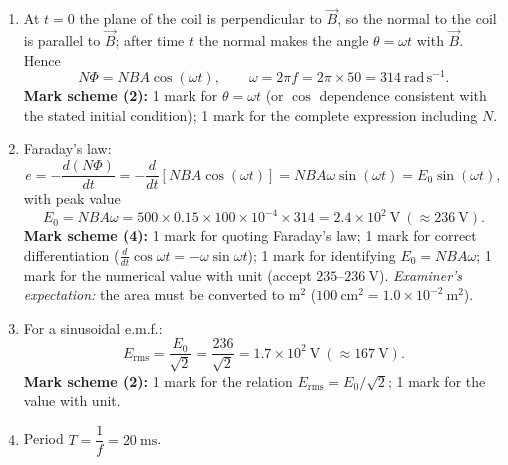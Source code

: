 \documentclass[11pt]{article}
\newcounter{popsec}
\newcounter{popsub}
\newcommand{\courssub}[1]{%
  \stepcounter{popsub}%
  \par\vspace{9pt}\noindent{\popxbold\fontsize{11.5}{13}\selectfont\color{popink}{\color{poporange}\thepopsec.\thepopsub}\hspace{6pt}#1}\par\nopagebreak\vspace{4pt}
}
\begin{document}
\courssub{I prepare for the GCE}

\begin{corrige}
\begin{enumerate}
\item[(a)] At $t = 0$ the plane of the coil is perpendicular to $\vec{B}$, so the normal to the coil is parallel to $\vec{B}$; after time $t$ the normal makes the angle $\theta = \omega t$ with $\vec{B}$. Hence
\[ N\Phi = NBA\cos(\omega t), \qquad \omega = 2\pi f = 2\pi \times 50 = 314\ \mathrm{rad\,s^{-1}}. \]
\textbf{Mark scheme (2):} 1 mark for $\theta = \omega t$ (or $\cos$ dependence consistent with the stated initial condition); 1 mark for the complete expression including $N$.
\item[(b)] Faraday's law:
\[ e = -\frac{d(N\Phi)}{dt} = -\frac{d}{dt}\left[NBA\cos(\omega t)\right] = NBA\omega\sin(\omega t) = E_0\sin(\omega t), \]
with peak value
\[ E_0 = NBA\omega = 500 \times 0.15 \times 100\times10^{-4} \times 314 = 2.4\times10^{2}\ \mathrm{V}\ (\approx 236\ \mathrm{V}). \]
\textbf{Mark scheme (4):} 1 mark for quoting Faraday's law; 1 mark for correct differentiation ($\frac{d}{dt}\cos\omega t = -\omega\sin\omega t$); 1 mark for identifying $E_0 = NBA\omega$; 1 mark for the numerical value with unit (accept $235$--$236\ \mathrm{V}$). \emph{Examiner's expectation:} the area must be converted to $\mathrm{m^2}$ ($100\ \mathrm{cm^2} = 1.0\times10^{-2}\ \mathrm{m^2}$).
\item[(c)] For a sinusoidal e.m.f.:
\[ E_{\mathrm{rms}} = \frac{E_0}{\sqrt{2}} = \frac{236}{\sqrt{2}} = 1.7\times10^{2}\ \mathrm{V}\ (\approx 167\ \mathrm{V}). \]
\textbf{Mark scheme (2):} 1 mark for the relation $E_{\mathrm{rms}} = E_0/\sqrt{2}$; 1 mark for the value with unit.
\item[(d)] Period $T = \dfrac{1}{f} = 20\ \mathrm{ms}$.
\begin{popfigure}
\begin{center}
\end{center}
\end{popfigure}
\end{enumerate}
\end{corrige}
\end{document}
